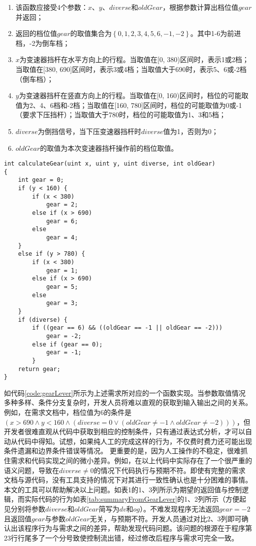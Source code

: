 \begin{enumerate}
	\item 该函数应接受4个参数：$ x $、$ y $、$ diverse $和$ oldGear $，根据参数计算出档位值$ gear $并返回；
	\item 返回的档位值$ gear $的取值集合为$\left\{0, 1, 2, 3, 4, 5, 6, -1, -2\right\}$。其中1-6为前进档，-2为倒车档；
	\item $ x $为变速器挡杆在水平方向上的行程。当取值在[0, 380)区间时，表示1或2档；当取值在[380, 690]区间时，表示3或4档；当取值大于690时，表示5、6或-2档（倒车档）；
	\item  $ y $为变速器挡杆在竖直方向上的行程。当取值在[0, 160)区间时，档位的可能取值为2、4、6档和-2档；当取值在[160, 780]区间时，档位的可能取值为0或-1（要求下压挡杆）；当取值大于780时，档位的可能取值为1、3和5档；
	\item $ diverse $为倒挡信号，当下压变速器挡杆时$ diverse $值为1，否则为0；
	\item $ oldGear $的取值为本次变速器挡杆操作前的档位取值。
\end{enumerate}

\begin{lstlisting}[label=code:gearLever,caption=变速器档位控制的一个函数实现]
int calculateGear(uint x, uint y, uint diverse, int oldGear)
{
	int gear = 0;
	if (y < 160) {
		if (x < 380)
			gear = 2;
		else if (x > 690)
			gear = 6;
		else
			gear = 4;
	}
	else if (y > 780) {
		if (x < 380)
			gear = 1;
		else if (x > 690)
			gear = 5;
		else
			gear = 3;
	}
	if (diverse) {
		if ((gear == 6) && ((oldGear == -1 || oldGear == -2)))
			gear = -2;
		else if (gear == 0);
			gear = -1;
		}
	return gear;
}
\end{lstlisting}

如代码\ref{code:gearLever}所示为上述需求所对应的一个函数实现。当参数取值情况多种多样、条件分支复杂时，开发人员将难以直观的获取到输入输出之间的关系。例如，在需求文档中，档位值为6的条件是$  (x > 690 ∧ y < 160 ∧ (diverse = 0 ∨ (oldGear ≠ -1 ∧ oldGear ≠ -2))) $，但开发者很难直观从代码中获取到相应的控制条件，只有通过表达式分析，才可以自动从代码中得知。试想，如果纯人工的完成这样的行为，不仅费时费力还可能出现条件遗漏和边界条件错误等情况。
更重要的是，因为人工操作的不稳定，很难抓住需求和代码实现之间的微小差异。例如，在以上代码中实际存在了一个很严重的语义问题，导致在$ diverse ≠ 0 $的情况下代码执行与预期不符。即使有完整的需求文档与源代码，没有工具支持的情况下对其进行一致性确认也是十分困难的事情。
本文的工具可以帮助解决以上问题。如表1的1、3列所示为期望的返回值与控制逻辑，而实际代码的行为如表\ref{tab:summaryFromGearLever}的1、2列所示（方便起见分别将参数$ diverse $和$ oldGear $简写为$ dv $和$ og $）。不难发现程序无法返回$ gear = -2 $且返回值$ gear $与参数$ oldGear $无关，与预期不符。开发人员通过对比2、3列即可确认出该程序行为与需求之间的差异，帮助发现代码问题。该问题的根源在于程序第23行行尾多了一个分号致使控制流出错，经过修改后程序与需求可完全一致。

